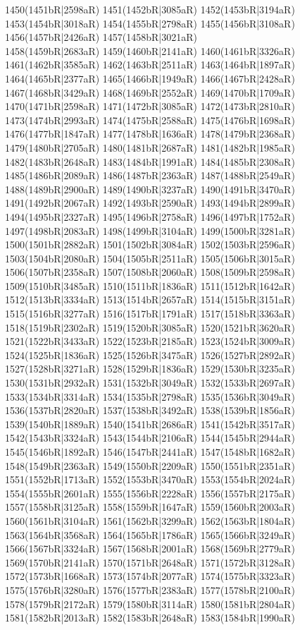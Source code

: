 1450(1451bR|2598aR) 1451(1452bR|3085aR) 1452(1453bR|3194aR) 1453(1454bR|3018aR) 1454(1455bR|2798aR) 1455(1456bR|3108aR) 1456(1457bR|2426aR) 1457(1458bR|3021aR) \\1458(1459bR|2683aR) 1459(1460bR|2141aR) 1460(1461bR|3326aR) 1461(1462bR|3585aR) 1462(1463bR|2511aR) 1463(1464bR|1897aR) 1464(1465bR|2377aR) 1465(1466bR|1949aR) 1466(1467bR|2428aR) \\1467(1468bR|3429aR) 1468(1469bR|2552aR) 1469(1470bR|1709aR) 1470(1471bR|2598aR) 1471(1472bR|3085aR) 1472(1473bR|2810aR) 1473(1474bR|2993aR) 1474(1475bR|2588aR) 1475(1476bR|1698aR) \\1476(1477bR|1847aR) 1477(1478bR|1636aR) 1478(1479bR|2368aR) 1479(1480bR|2705aR) 1480(1481bR|2687aR) 1481(1482bR|1985aR) 1482(1483bR|2648aR) 1483(1484bR|1991aR) 1484(1485bR|2308aR) \\1485(1486bR|2089aR) 1486(1487bR|2363aR) 1487(1488bR|2549aR) 1488(1489bR|2900aR) 1489(1490bR|3237aR) 1490(1491bR|3470aR) 1491(1492bR|2067aR) 1492(1493bR|2590aR) 1493(1494bR|2899aR) \\1494(1495bR|2327aR) 1495(1496bR|2758aR) 1496(1497bR|1752aR) 1497(1498bR|2083aR) 1498(1499bR|3104aR) 1499(1500bR|3281aR) 1500(1501bR|2882aR) 1501(1502bR|3084aR) 1502(1503bR|2596aR) \\1503(1504bR|2080aR) 1504(1505bR|2511aR) 1505(1506bR|3015aR) 1506(1507bR|2358aR) 1507(1508bR|2060aR) 1508(1509bR|2598aR) 1509(1510bR|3485aR) 1510(1511bR|1836aR) 1511(1512bR|1642aR) \\1512(1513bR|3334aR) 1513(1514bR|2657aR) 1514(1515bR|3151aR) 1515(1516bR|3277aR) 1516(1517bR|1791aR) 1517(1518bR|3363aR) 1518(1519bR|2302aR) 1519(1520bR|3085aR) 1520(1521bR|3620aR) \\1521(1522bR|3433aR) 1522(1523bR|2185aR) 1523(1524bR|3009aR) 1524(1525bR|1836aR) 1525(1526bR|3475aR) 1526(1527bR|2892aR) 1527(1528bR|3271aR) 1528(1529bR|1836aR) 1529(1530bR|3235aR) \\1530(1531bR|2932aR) 1531(1532bR|3049aR) 1532(1533bR|2697aR) 1533(1534bR|3314aR) 1534(1535bR|2798aR) 1535(1536bR|3049aR) 1536(1537bR|2820aR) 1537(1538bR|3492aR) 1538(1539bR|1856aR) \\1539(1540bR|1889aR) 1540(1541bR|2686aR) 1541(1542bR|3517aR) 1542(1543bR|3324aR) 1543(1544bR|2106aR) 1544(1545bR|2944aR) 1545(1546bR|1892aR) 1546(1547bR|2441aR) 1547(1548bR|1682aR) \\1548(1549bR|2363aR) 1549(1550bR|2209aR) 1550(1551bR|2351aR) 1551(1552bR|1713aR) 1552(1553bR|3470aR) 1553(1554bR|2024aR) 1554(1555bR|2601aR) 1555(1556bR|2228aR) 1556(1557bR|2175aR) \\1557(1558bR|3125aR) 1558(1559bR|1647aR) 1559(1560bR|2003aR) 1560(1561bR|3104aR) 1561(1562bR|3299aR) 1562(1563bR|1804aR) 1563(1564bR|3568aR) 1564(1565bR|1786aR) 1565(1566bR|3249aR) \\1566(1567bR|3324aR) 1567(1568bR|2001aR) 1568(1569bR|2779aR) 1569(1570bR|2141aR) 1570(1571bR|2648aR) 1571(1572bR|3128aR) 1572(1573bR|1668aR) 1573(1574bR|2077aR) 1574(1575bR|3323aR) \\1575(1576bR|3280aR) 1576(1577bR|2383aR) 1577(1578bR|2100aR) 1578(1579bR|2172aR) 1579(1580bR|3114aR) 1580(1581bR|2804aR) 1581(1582bR|2013aR) 1582(1583bR|2648aR) 1583(1584bR|1990aR) 